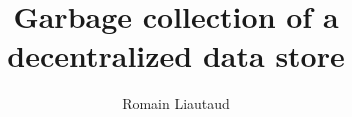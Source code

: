 \documentclass[11pt]{article}
\title{Garbage collection of a decentralized data store}
\author{Romain Liautaud}
\begin{document}



\bigskip






\newpage


\end{document}
